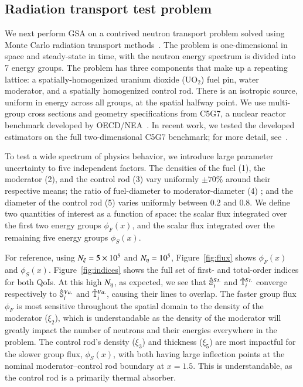\subsection{Radiation transport test problem}
We next perform GSA on a contrived neutron transport problem solved using Monte Carlo radiation transport methods~\cite{lux-koblinger-90}. 
The problem is one-dimensional in space and steady-state in time, with the neutron energy spectrum is divided into 7 energy groups.
The problem has three components that make up a repeating lattice: a spatially-homogenized uranium dioxide (UO$_2$) fuel pin, water moderator, and a spatially homogenized control rod. 
There is an isotropic source, uniform in energy across all groups, at the spatial halfway point.
We use multi-group cross sections and geometry specifications from C5G7, a nuclear reactor benchmark developed by OECD/NEA~\cite{c5g7-2005}. 
In recent work, we tested the developed estimators on the full two-dimensional C5G7 benchmark; for more detail, see~\cite{clements-mc-2025}.

To test a wide spectrum of physics behavior, we introduce large parameter uncertainty to five independent factors. 
The densities of the fuel (1), the moderator (2), and the control rod (3) vary uniformly $\pm 70\%$ around their respective means; the ratio of fuel-diameter to moderator-diameter (4) ; and the diameter of the control rod (5) varies uniformly between 0.2 and 0.8. 
We define two quantities of interest as a function of space: the scalar flux integrated over the first two energy groups $\phi_F (x)$, and the scalar flux integrated over the remaining five energy groups $\phi_S(x)$.

For reference, using ${N_\xi}=5 \times 10^5$ and ${N_\eta}=10^5$, Figure~\ref{fig:flux} shows $\phi_F (x)$ and $\phi_S (x)$. Figure~\ref{fig:indices} shows the full set of first- and total-order indices for both QoIs.
At this high ${N_\eta}$, as expected, we see that $\hat{\mathbb{S}}_{i}^{St.}$ and $\hat{\mathbb{T}}_{i}^{St.}$ converge respectively to $\hat{\mathbb{S}}_{i}^{Va.}$ and $\hat{\mathbb{T}}_{i}^{Va.}$, causing their lines to overlap.
The faster group flux $\phi_F$ is most sensitive throughout the spatial domain to the density of the moderator ($\xi_2$), which is understandable as the density of the moderator will greatly impact the number of neutrons and their energies everywhere in the problem. 
The control rod's density ($\xi_3$) and thickness ($\xi_5$) are most impactful for the slower group flux, $\phi_S(x)$, with both having large inflection points at the nominal moderator--control rod boundary at $x=1.5$.
This is understandable, as the control rod is a primarily thermal absorber.

